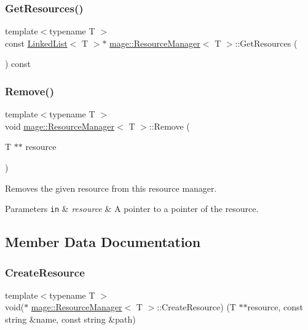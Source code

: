 \subsubsection{\texorpdfstring{Get\+Resources()}{GetResources()}}
{\footnotesize\ttfamily template$<$typename T $>$ \\
const \hyperlink{classmage_1_1_linked_list}{Linked\+List}$<$ T $>$$\ast$ \hyperlink{classmage_1_1_resource_manager}{mage\+::\+Resource\+Manager}$<$ T $>$\+::Get\+Resources (\begin{DoxyParamCaption}{ }\end{DoxyParamCaption}) const}

\hypertarget{classmage_1_1_resource_manager_a9fdc16b5f1627d0684c5a7e870290461}{}\label{classmage_1_1_resource_manager_a9fdc16b5f1627d0684c5a7e870290461} 
\subsubsection{\texorpdfstring{Remove()}{Remove()}}
{\footnotesize\ttfamily template$<$typename T $>$ \\
void \hyperlink{classmage_1_1_resource_manager}{mage\+::\+Resource\+Manager}$<$ T $>$\+::Remove (\begin{DoxyParamCaption}\item[{T $\ast$$\ast$}]{resource }\end{DoxyParamCaption})}

Removes the given resource from this resource manager.


\begin{DoxyParams}[1]{Parameters}
\mbox{\tt in}  & {\em resource} & A pointer to a pointer of the resource. \\
\hline
\end{DoxyParams}


\subsection{Member Data Documentation}
\hypertarget{classmage_1_1_resource_manager_a1175cdd82a5407dd099b53a432ca9a95}{}\label{classmage_1_1_resource_manager_a1175cdd82a5407dd099b53a432ca9a95} 
\subsubsection{\texorpdfstring{Create\+Resource}{CreateResource}}
{\footnotesize\ttfamily template$<$typename T $>$ \\
void($\ast$ \hyperlink{classmage_1_1_resource_manager}{mage\+::\+Resource\+Manager}$<$ T $>$\+::Create\+Resource) (T $\ast$$\ast$resource, const string \&name, const string \&path)\hspace{0.3cm}{\ttfamily [private]}}

